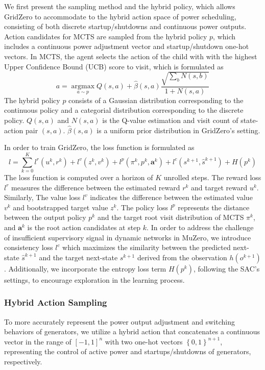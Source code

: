 We first present the sampling method and the hybrid policy, which allows GridZero to accommodate to the hybrid action space of power scheduling, consisting of both discrete startup/shutdowns and continuous power outputs. 
Action candidates for MCTS are sampled from the hybrid policy $p$, which includes a continuous power adjustment vector and startup/shutdown one-hot vectors. 
In MCTS, the agent selects the action of the child with with the highest Upper Confidence Bound (UCB) score to visit, which is formulated as
\begin{equation}
    a=\mathop{\arg\max}\limits_{a\sim p}Q(s,a)+\hat{\beta}(s,a)\frac{\sqrt{\sum_b N(s,b)}}{1+N(s,a)}
\end{equation}
The hybrid policy $p$ consists of a Gaussian distribution corresponding to the continuous policy and a categorial distribution corresponding to the discrete policy. $Q(s,a)$ and $N(s,a)$ is the Q-value estimation and visit count of state-action pair $(s,a)$. $\hat{\beta}(s,a)$ is a uniform prior distribution in GridZero's setting. 

In order to train GridZero, the loss function is formulated as
\begin{equation}
    l=\sum_{k=0}^K l^r(u^{k},r^{k})+l^v(z^{k},v^{k})+l^p(\pi^{k},p^{k},\bm{a}^k)+l^c(s^{k+1},\hat{s}^{k+1})+H(p^{k})
\end{equation}
The loss function is computed over a horizon of $K$ unrolled steps. The reward loss $l^r$ measures the difference between the estimated reward $r^k$ and target reward $u^{k}$. Similarly, The value loss $l^v$ indicates the difference between the estimated value $v^k$ and bootstrapped target value $z^{k}$. The policy loss $l^p$ represents the distance between the output policy $p^k$ and the target root visit distribution of MCTS $\pi^{k}$, and $\bm{a}^k$ is the root action candidates at step $k$.
In order to address the challenge of insufficient supervisory signal in dynamic networks in MuZero, we introduce consistency loss $l^c$ which maximizes the similarity between the predicted next-state $\hat{s}^{k+1}$ and the target next-state $s^{k+1}$ derived from the observation $h(o^{k+1})$. Additionally, we incorporate the entropy loss term $H(p^{k})$, following the SAC's settings, to encourage exploration in the learning process\cite{haarnoja2018soft}. 

\subsubsection*{Hybrid Action Sampling}
To more accurately represent the power output adjustment and switching behaviors of generators, we utilize a hybrid action that concatenates a continuous vector in the range of $[-1,1]^n$ with two one-hot vectors $\left\{0,1\right\}^{n+1}$, representing the control of active power and startups/shutdowns of generators, respectively.


